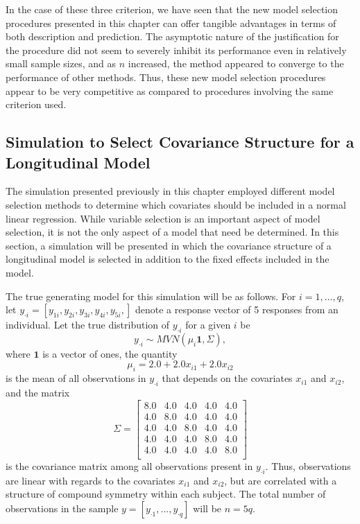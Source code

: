 		In the case of these three criterion, we have seen that the new model selection procedures presented in this chapter can offer tangible advantages in terms of both description
		and prediction. The asymptotic nature of the justification for the procedure did not seem to severely inhibit its performance even in relatively small sample sizes, and as
		$n$ increased, the method appeared to converge to the performance of other methods. Thus, these new model selection procedures appear to be very competitive as compared to
		procedures involving the same criterion used.

		\subsection{Simulation to Select Covariance Structure for a Longitudinal Model}

		The simulation presented previously in this chapter employed different model selection methods to determine which covariates should be included in a normal linear regression.
		While variable selection is an important aspect of model selection, it is not the only aspect of a model that need be determined. In this section, a simulation will be presented
		in which the covariance structure of a longitudinal model is selected in addition to the fixed effects included in the model.

		The true generating model for this simulation will be as follows. For $i = 1,...,q$, let $y_{\cdot i} = [y_{1 i},y_{2 i},y_{3 i},y_{4 i},y_{5 i},]$ denote a response vector of 5
		responses from an individual. Let the true distribution of $y_{\cdot i}$ for a given $i$ be
		\begin{equation}
			y_{\cdot i} \sim MVN( \mu_i \mathbf{1}, \Sigma) ,
		\end{equation}
		where $\mathbf{1}$ is a vector of ones, the quantity
		\begin{equation}
			\mu_i = 2.0 + 2.0 x_{i1} + 2.0 x_{i2}
		\end{equation}
		is the mean of all observations in $y_{\cdot i}$ that depends on the covariates $x_{i1}$ and $x_{i2}$, and the matrix
		\begin{equation}
			\Sigma = 
			\begin{bmatrix}
				8.0 & 4.0 & 4.0 & 4.0 & 4.0 \\
				4.0 & 8.0 & 4.0 & 4.0 & 4.0 \\
				4.0 & 4.0 & 8.0 & 4.0 & 4.0 \\
				4.0 & 4.0 & 4.0 & 8.0 & 4.0 \\
				4.0 & 4.0 & 4.0 & 4.0 & 8.0 \\
			\end{bmatrix}
		\end{equation}
		is the covariance matrix among all observations present in $y_{\cdot i}$. Thus, observations are linear with regards to the covariates $x_{i1}$ and $x_{i2}$, but are correlated
		with a structure of compound symmetry within each subject. The total number of observations in the sample $y = [y_{\cdot 1},...,y_{\cdot q}]$ will be $n = 5q$.

